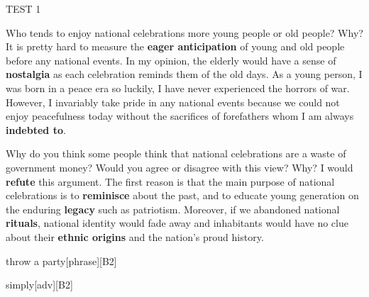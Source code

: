 \begin{glossarymc}[Cambridge 7]
\begin{test}{TEST 1}
    \begin{qa}{Who tends to enjoy national celebrations more young people or old people? Why?}
    It is pretty hard to measure the \textbf{eager anticipation} of young and old people before any national events. In my opinion, the elderly would have a sense of \textbf{nostalgia} as each celebration reminds them of the old days. As a young person, I was born in a peace era so luckily, I have never experienced the horrors of war. However, I invariably take pride in any national events because we could not enjoy peacefulness today without the sacrifices of forefathers whom I am always \textbf{indebted to}.
    \end{qa}

    \begin{qa}{Why do you think some people think that national celebrations are a waste of government money? Would you agree or disagree with this view? Why?}
    I would \textbf{refute} this argument. The first reason is that the main purpose of national celebrations is to \textbf{reminisce} about the past, and to educate young generation on the enduring \textbf{legacy} such as patriotism. Moreover, if we abandoned national \textbf{rituals}, national identity would fade away and inhabitants would have no clue about their \textbf{ethnic origins} and the nation's proud history.
    \end{qa}

        \begin{VocabExplain}[Part 3]
            \begin{ExplainCard}{throw a party}[phrase][B2]
            \end{ExplainCard}

            \begin{ExplainCard}{simply}[adv][B2]
            \end{ExplainCard}


\end{VocabExplain}
\end{test}
\end{glossarymc}

